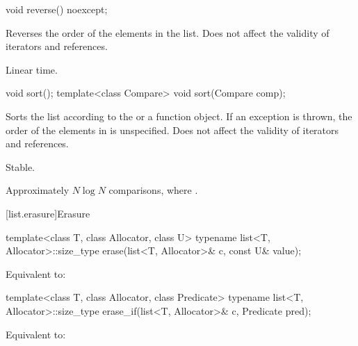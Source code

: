 %
\begin{itemdecl}
void reverse() noexcept;
\end{itemdecl}

\begin{itemdescr}
\pnum
\effects
Reverses the order of the elements in the list.
Does not affect the validity of iterators and references.

\pnum
\complexity
Linear time.
\end{itemdescr}

%
\begin{itemdecl}
void sort();
template<class Compare> void sort(Compare comp);
\end{itemdecl}

\begin{itemdescr}
\pnum
\effects
Sorts the list according to the  or a  function object.
If an exception is thrown,
the order of the elements in  is unspecified.
Does not affect the validity of iterators and references.

\pnum
\remarks
Stable.

\pnum
\complexity
Approximately
$N \log N$
comparisons, where
.
\end{itemdescr}

[list.erasure]{Erasure}

%
\begin{itemdecl}
template<class T, class Allocator, class U>
  typename list<T, Allocator>::size_type
    erase(list<T, Allocator>& c, const U& value);
\end{itemdecl}

\begin{itemdescr}
\pnum
\effects
Equivalent to: 
\end{itemdescr}

%
\begin{itemdecl}
template<class T, class Allocator, class Predicate>
  typename list<T, Allocator>::size_type
    erase_if(list<T, Allocator>& c, Predicate pred);
\end{itemdecl}

\begin{itemdescr}
\pnum
\effects
Equivalent to: 
\end{itemdescr}

